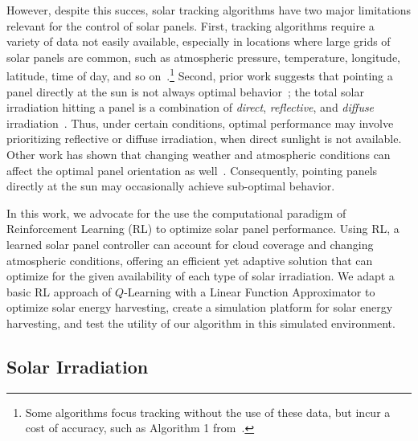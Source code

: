 \documentclass[11pt]{article}
\begin{document}
However, despite this succes, solar tracking algorithms have two major limitations relevant for the control of solar panels. First, tracking algorithms require a variety of data not easily available, especially in locations where large grids of solar panels are common, such as atmospheric pressure, temperature, longitude, latitude, time of day, and so on~\cite{Grena2012}.\footnote{Some algorithms focus tracking without the use of these data, but incur a cost of accuracy, such as Algorithm 1 from~\citet{Grena2012}.} Second, prior work suggests that pointing a panel directly at the sun is not always optimal behavior~\citet{Kelly2009,Hussein1995,King2001}; the total solar irradiation hitting a panel is a combination of {\it direct}, {\it reflective}, and {\it diffuse} irradiation~\cite{Benghanem2011}. Thus, under certain conditions, optimal performance may involve prioritizing reflective or diffuse irradiation, when direct sunlight is not available. Other work has shown that changing weather and atmospheric conditions can affect the optimal panel orientation as well~\cite{Kelly2009,Hussein1995}. Consequently, pointing panels directly at the sun may  occasionally achieve sub-optimal behavior.

In this work, we advocate for the use the computational paradigm of Reinforcement Learning (RL) to optimize solar panel performance. Using RL, a learned solar panel controller can account for cloud coverage and changing atmospheric conditions, offering an efficient yet adaptive solution that can optimize for the given availability of each type of solar irradiation. We adapt a basic RL approach of $Q$-Learning with a Linear Function Approximator to optimize solar energy harvesting, create a simulation platform for solar energy harvesting, and test the utility of our algorithm in this simulated environment.


\subsection{Solar Irradiation}
\end{document}
